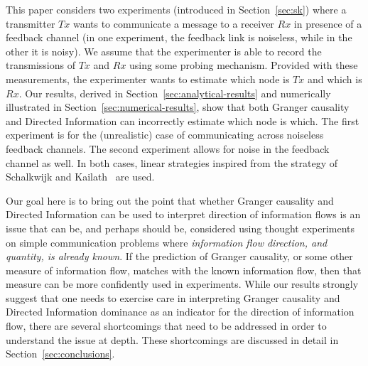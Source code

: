 \documentclass[conference]{IEEEtran}
\begin{document}

This paper considers two experiments (introduced in Section~\ref{sec:sk}) where a transmitter $Tx$ wants to communicate a message to a receiver $Rx$ in presence of a feedback channel (in one experiment, the feedback link is noiseless, while in the other it is noisy). We assume that the experimenter is able to record the transmissions of $Tx$ and $Rx$ using some probing mechanism. Provided with these measurements, the experimenter wants to estimate which node is $Tx$ and which is $Rx$. Our results, derived in Section~\ref{sec:analytical-results} and numerically illustrated in Section~\ref{sec:numerical-results}, show that both Granger causality and Directed Information can incorrectly estimate which node is which. The first experiment is for the (unrealistic) case of communicating across noiseless feedback channels. The second experiment allows for noise in the feedback channel as well. In both cases, linear strategies inspired from the strategy of Schalkwijk and Kailath~\cite{S&K} are used.

Our goal here is to bring out the point that whether Granger causality and Directed Information can be used to interpret direction of information flows is an issue that can be, and perhaps should be, considered using thought experiments on simple communication problems where \textit{information flow direction, and quantity, is already known}. If the prediction of Granger causality, or some other measure of information flow, matches with the known information flow, then that measure can be more confidently used in experiments. While our results strongly suggest that one needs to exercise care in interpreting Granger causality and Directed Information dominance as an indicator for the direction of information flow, there are several shortcomings that need to be addressed in order to understand the issue at depth. These shortcomings are discussed in detail in Section~\ref{sec:conclusions}.
\end{document}
